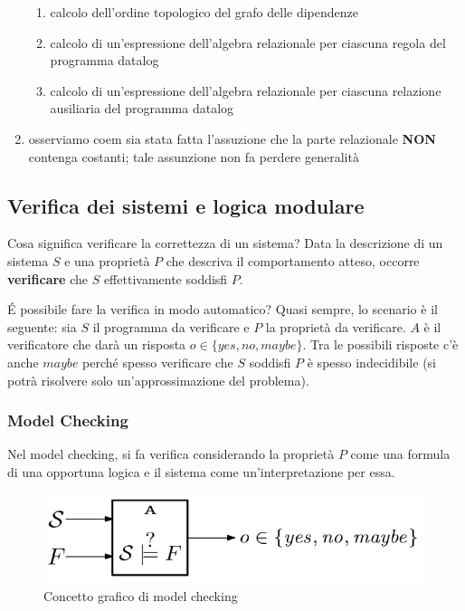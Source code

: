 \documentclass{article}
\begin{document}
\begin{enumerate}
\begin{enumerate}
        \item calcolo dell'ordine topologico del grafo delle dipendenze
        \item calcolo di un'espressione dell'algebra relazionale per ciascuna regola del programma datalog
        \item calcolo di un'espressione dell'algebra relazionale per ciascuna relazione ausiliaria del programma datalog
    \end{enumerate}
    \item osserviamo coem sia stata fatta l'assuzione che la parte relazionale \textbf{NON} contenga costanti; tale assunzione non fa perdere generalità
\end{enumerate}

\subsection{Verifica dei sistemi e logica modulare}
Cosa significa verificare la correttezza di un sistema? Data la descrizione di un sistema $S$ e una proprietà $P$ che descriva il comportamento atteso, occorre \textbf{verificare} che $S$ effettivamente soddisfi $P$.

\bigskip

\'E possibile fare la verifica in modo automatico? Quasi sempre, lo scenario è il seguente: sia $S$ il programma da verificare e $P$ la proprietà da verificare. $A$ è il verificatore che darà un risposta $o\in\{yes, no, maybe\}$. Tra le possibili risposte c'è anche $maybe$ perché spesso verificare che $S$ soddisfi $P$ è spesso indecidibile (si potrà risolvere solo un'approssimazione del problema).

\subsubsection{Model Checking}
Nel model checking, si fa verifica considerando la proprietà $P$ come una formula di una opportuna logica e il sistema come un’interpretazione per essa.

\begin{figure}[!ht]
    \centering
    \includegraphics[width=\textwidth]{modelcheck.png}
    \caption{Concetto grafico di model checking}
    \label{fig:model}
\end{figure}
\end{document}
